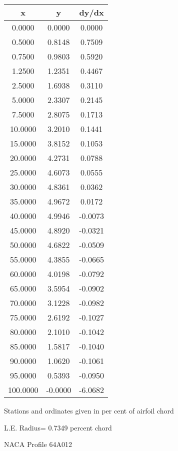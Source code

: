 \documentclass[11pt]{book}
\begin{document}
 \vspace{8mm}
 \begin{tabular}{|c|c|c|} \hline 
  x  &  y  &  dy/dx \\
 \hline
0.0000 & 0.0000 & 0.0000 \\
0.5000 & 0.8148 & 0.7509 \\
0.7500 & 0.9803 & 0.5920 \\
1.2500 & 1.2351 & 0.4467 \\
2.5000 & 1.6938 & 0.3110 \\
5.0000 & 2.3307 & 0.2145 \\
7.5000 & 2.8075 & 0.1713 \\
10.0000 & 3.2010 & 0.1441 \\
15.0000 & 3.8152 & 0.1053 \\
20.0000 & 4.2731 & 0.0788 \\
25.0000 & 4.6073 & 0.0555 \\
30.0000 & 4.8361 & 0.0362 \\
35.0000 & 4.9672 & 0.0172 \\
40.0000 & 4.9946 & -0.0073 \\
45.0000 & 4.8920 & -0.0321 \\
50.0000 & 4.6822 & -0.0509 \\
55.0000 & 4.3855 & -0.0665 \\
60.0000 & 4.0198 & -0.0792 \\
65.0000 & 3.5954 & -0.0902 \\
70.0000 & 3.1228 & -0.0982 \\
75.0000 & 2.6192 & -0.1027 \\
80.0000 & 2.1010 & -0.1042 \\
85.0000 & 1.5817 & -0.1040 \\
90.0000 & 1.0620 & -0.1061 \\
95.0000 & 0.5393 & -0.0950 \\
100.0000 & -0.0000 & -6.0682 \\
 \hline
 \end{tabular}
 \vspace{8mm}


Stations and ordinates given in per cent of airfoil chord 


L.E. Radius=  0.7349 percent chord
 \newpage
  \label{p64A012}
 \begin{Large}
 NACA Profile 64A012
 \end{Large}
  
\end{document}
